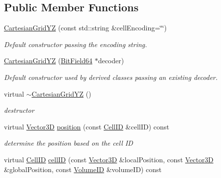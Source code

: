 \subsection*{Public Member Functions}
\begin{DoxyCompactItemize}
\item 
\hyperlink{class_d_d4hep_1_1_d_d_segmentation_1_1_cartesian_grid_y_z_abed51e41abcba3100aef90bb0c65190d}{CartesianGridYZ} (const std::string \&cellEncoding=\char`\"{}\char`\"{})
\begin{DoxyCompactList}\small\item\em Default constructor passing the encoding string. \item\end{DoxyCompactList}\item 
\hyperlink{class_d_d4hep_1_1_d_d_segmentation_1_1_cartesian_grid_y_z_a9f4c387d36c1ce52d40f7eb85618c6fd}{CartesianGridYZ} (\hyperlink{class_d_d4hep_1_1_d_d_segmentation_1_1_bit_field64}{BitField64} $\ast$decoder)
\begin{DoxyCompactList}\small\item\em Default constructor used by derived classes passing an existing decoder. \item\end{DoxyCompactList}\item 
virtual \hyperlink{class_d_d4hep_1_1_d_d_segmentation_1_1_cartesian_grid_y_z_a79289b0fc6f6ff298284ac1bb2266c79}{$\sim$CartesianGridYZ} ()
\begin{DoxyCompactList}\small\item\em destructor \item\end{DoxyCompactList}\item 
virtual \hyperlink{struct_d_d4hep_1_1_d_d_segmentation_1_1_vector3_d}{Vector3D} \hyperlink{class_d_d4hep_1_1_d_d_segmentation_1_1_cartesian_grid_y_z_aaad4f014c52e680a4954971d75d13357}{position} (const \hyperlink{namespace_d_d4hep_1_1_d_d_segmentation_ac7af071d85cb48820914434a07e21ba1}{CellID} \&cellID) const 
\begin{DoxyCompactList}\small\item\em determine the position based on the cell ID \item\end{DoxyCompactList}\item 
virtual \hyperlink{namespace_d_d4hep_1_1_d_d_segmentation_ac7af071d85cb48820914434a07e21ba1}{CellID} \hyperlink{class_d_d4hep_1_1_d_d_segmentation_1_1_cartesian_grid_y_z_a96102e475a228e43a48f75fe2e98f191}{cellID} (const \hyperlink{struct_d_d4hep_1_1_d_d_segmentation_1_1_vector3_d}{Vector3D} \&localPosition, const \hyperlink{struct_d_d4hep_1_1_d_d_segmentation_1_1_vector3_d}{Vector3D} \&globalPosition, const \hyperlink{namespace_d_d4hep_1_1_d_d_segmentation_a61a6833a18d1800bdef176595f83e3ba}{VolumeID} \&volumeID) const 

\end{DoxyCompactItemize}
